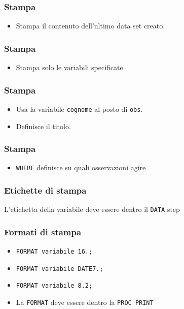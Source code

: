 \documentclass[aspectratio=169]{beamer}
\begin{document}
\begin{frame}[containsverbatim]\frametitle{Stampa}
  \begin{itemize}
  \item
    Stampa il contenuto dell'ultimo data set creato.
  \end{itemize}\end{frame}

\begin{frame}[containsverbatim]\frametitle{Stampa}
  \begin{itemize}
  \item
    Stampa solo le variabili specificate
  \end{itemize}\end{frame}

\begin{frame}[containsverbatim]\frametitle{Stampa}
  \begin{itemize}
  \item
    Usa la variabile \texttt{cognome} al posto di \texttt{obs}.
  \item
    Definisce il titolo.
  \end{itemize}\end{frame}

\begin{frame}[containsverbatim]\frametitle{Stampa}
  \begin{itemize}
  \item
    \verb+WHERE+ definisce su quali osservazioni agire
  \end{itemize}\end{frame}

\begin{frame}[containsverbatim]\frametitle{Etichette di stampa}

  \vspace{1em}
  L'etichetta della variabile deve essere dentro il \verb!DATA! step
\end{frame}




\begin{frame}[containsverbatim]\frametitle{Formati di stampa}
  \begin{itemize}
  \item
    \verb!FORMAT variabile 16.;!
  \item
    \verb!FORMAT variabile DATE7.;!
  \item
    \verb!FORMAT variabile 8.2;!
  \item
    La \verb!FORMAT! deve essere dentro la \verb!PROC PRINT!
  \end{itemize}
\end{frame}
\end{document}
